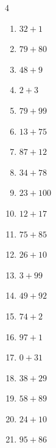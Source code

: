 \begin{multicols}{4}
\begin{enumerate}
  \item $32+1$
        \phantom{$=33$}

  \item $79+80$
        \phantom{$=159$}

  \item $48+9$
        \phantom{$=57$}

  \item $2+3$
        \phantom{$=5$}

  \item $79+99$
        \phantom{$=178$}

  \item $13+75$
        \phantom{$=88$}

  \item $87+12$
        \phantom{$=99$}

  \item $34+78$
        \phantom{$=112$}

  \item $23+100$
        \phantom{$=123$}

  \item $12+17$
        \phantom{$=29$}

\columnbreak %

  \item $75+85$
        \phantom{$=160$}

  \item $26+10$
        \phantom{$=36$}

  \item $3+99$
        \phantom{$=102$}

  \item $49+92$
        \phantom{$=141$}

  \item $74+2$
        \phantom{$=76$}

  \item $97+1$
        \phantom{$=98$}

  \item $0+31$
        \phantom{$=31$}

  \item $38+29$
        \phantom{$=67$}

  \item $58+89$
        \phantom{$=147$}

  \item $24+10$
        \phantom{$=34$}

  \item $95+86$
        \phantom{$=181$}


\end{enumerate}
\end{multicols}
